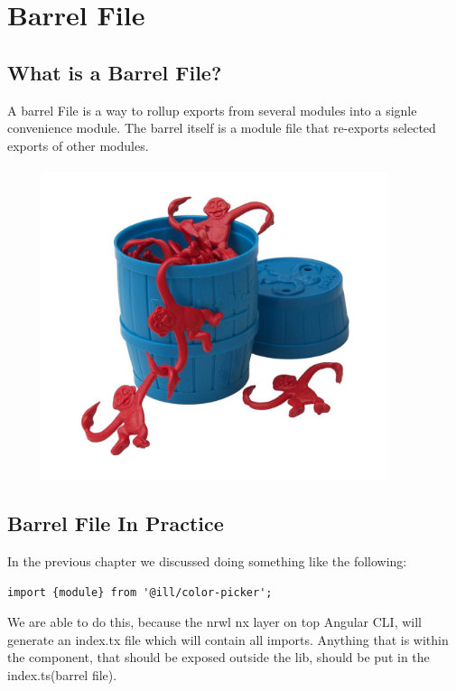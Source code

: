 \maketitle{}
\section{ Barrel File }

\subsection{ What is a Barrel File? }

A barrel File is a way to rollup exports from several modules into a signle
convenience module. The barrel itself is a module file that re-exports selected
exports of other modules.
\\
\\
\includegraphics[width=12.1cm, height=9cm]{typescript/barrel-file/monkey-barrel}

\subsection{ Barrel File In Practice }
In the previous chapter we discussed doing something like the following:
\begin{lstlisting}
import {module} from '@ill/color-picker';
\end{lstlisting}

We are able to do this, because the nrwl nx layer on top Angular CLI, will
generate an index.tx file which will contain all imports. Anything that is
within the component, that should be exposed outside the lib, should be put
in the index.ts(barrel file).

